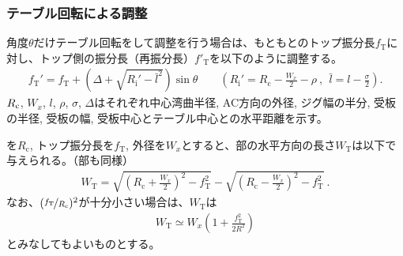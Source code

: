 \subsubsection{テーブル回転による調整}
角度$\theta$だけテーブル回転をして調整を行う場合は、もともとのトップ振分長$f_\mathrm T$に対し、トップ側の振分長（再振分長）$f'_\mathrm T$を以下のように調整する。
\begin{align*}
  f_\mathrm T'
  = f_\mathrm T+\left(\Delta+\sqrt{R_\mathrm i'-\bar l^2}\right)\sin\theta\qquad
    \left(R_\mathrm i' = R_\mathrm c-\frac{W_x}2-\rho~,~~\bar l = l-\frac\sigma2\right).
\end{align*}
$R_\textrm c$, $W_x$, $l$, $\rho$, $\sigma$, $\Delta$はそれぞれ中心湾曲半径, AC方向の外径, ジグ幅の半分, 受板の半径, 受板の幅, 受板中心とテーブル中心との水平距離を示す。



\clearpage
\nameCenterCurvature を$R_\mathrm c$, トップ振分長を$f_\mathrm T$, 外径を$W_x$とすると、\nameTopEndFace 部の水平方向の長さ$W_\mathrm T$は以下で与えられる。（\nameBottomEndFace 部も同様）
\begin{align*}
  W_\mathrm T
  = \sqrt{\left(R_\mathrm c+\frac{W_x}2\right)^2-f_\mathrm T^2}
    -\sqrt{\left(R_\mathrm c-\frac{W_x}2\right)^2-f_\mathrm T^2}\ .
\end{align*}
なお、$(\nicefrac{f_\mathrm T}{R_\mathrm c})^2$が十分小さい場合は、$W_\mathrm T$は
\begin{align*}
  W_\mathrm T \simeq W_x\left(1+\frac{f_\mathrm T^2}{2R^2}\right)
\end{align*}
とみなしてもよいものとする。




